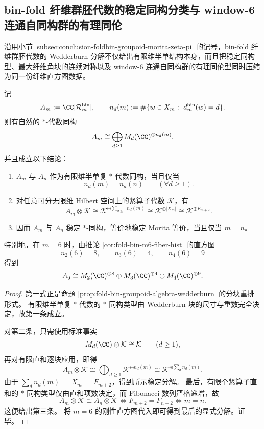 \subsection{bin-fold 纤维群胚代数的稳定同构分类与 window-6 连通自同构群的有理同伦}\label{subsec:conclusion-foldbin-groupoid-stable-homotopy-window6}
沿用小节 \ref{subsec:conclusion-foldbin-groupoid-morita-zeta-pi} 的记号，bin-fold 纤维群胚代数的 Wedderburn 分解不仅给出有限维半单结构本身，而且把稳定同构型、最大纤维角块的连续对称以及 window-\(6\) 连通自同构群的有理同伦型同时压缩为同一份纤维直方图数据。

\begin{theorem}[纤维直方图决定的稳定同构分类]\label{thm:conclusion-foldbin-groupoid-stable-isomorphism-classification}
记
\[
A_m:=\CC[\mathcal R_m^{\mathrm{bin}}],
\qquad
n_d(m):=\#\{w\in X_m:\ d_m^{\mathrm{bin}}(w)=d\}.
\]
则有自然的 \(\ast\)-代数同构
\[
A_m\cong \bigoplus_{d\ge 1}M_d(\CC)^{\oplus n_d(m)}.
\]
并且成立以下结论：
\begin{enumerate}
  \item \(A_m\) 与 \(A_n\) 作为有限维半单复 \(\ast\)-代数同构，当且仅当
  \[
  n_d(m)=n_d(n)\qquad(\forall d\ge 1).
  \]
  \item 对任意可分无限维 Hilbert 空间上的紧算子代数 \(\mathcal K\)，有
  \[
  A_m\otimes\mathcal K
  \cong
  \mathcal K^{\oplus \sum_{d\ge 1}n_d(m)}
  \cong
  \mathcal K^{\oplus |X_m|}
  \cong
  \mathcal K^{\oplus F_{m+2}}.
  \]
  \item 因而 \(A_m\) 与 \(A_n\) 稳定 \(\ast\)-同构，等价地稳定 Morita 等价，当且仅当 \(m=n\)。
\end{enumerate}
特别地，在 \(m=6\) 时，由推论 \ref{cor:fold-bin-m6-fiber-hist} 的直方图
\[
n_2(6)=8,\qquad n_3(6)=4,\qquad n_4(6)=9
\]
得到
\[
A_6\cong M_2(\CC)^{\oplus 8}\oplus M_3(\CC)^{\oplus 4}\oplus M_4(\CC)^{\oplus 9}.
\]
\end{theorem}
\begin{proof}
第一式正是命题 \ref{prop:fold-bin-groupoid-algebra-wedderburn} 的分块重排形式。
有限维半单复 \(\ast\)-代数的 \(\ast\)-同构类型由 Wedderburn 块的尺寸与重数完全决定，故第一条成立。

对第二条，只需使用标准事实
\[
M_d(\CC)\otimes\mathcal K\cong \mathcal K
\qquad(d\ge 1),
\]
再对有限直和逐块应用，即得
\[
A_m\otimes\mathcal K
\cong
\bigoplus_{d\ge 1}\mathcal K^{\oplus n_d(m)}
\cong
\mathcal K^{\oplus \sum_d n_d(m)}.
\]
由于 \(\sum_d n_d(m)=|X_m|=F_{m+2}\)，得到所示稳定分解。
最后，有限个紧算子直和的 \(\ast\)-同构类型仅由直和项数决定，而 Fibonacci 数列严格递增，故
\[
A_m\otimes\mathcal K\cong A_n\otimes\mathcal K
\iff
F_{m+2}=F_{n+2}
\iff
m=n.
\]
这便给出第三条。
将 \(m=6\) 的刚性直方图代入即可得到最后的显式分解。证毕。
\end{proof}

